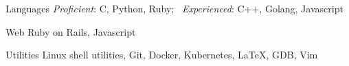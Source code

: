 


\begin{cvskills}


  \cvskill
  {Languages}
  {\textit{Proficient}: C, Python, Ruby; \
    \textit{Experienced}: C++, Golang, Javascript}


  \cvskill
  {Web}
  {Ruby on Rails, Javascript}


  \cvskill
  {Utilities}
  {Linux shell utilities, Git, Docker, Kubernetes, \LaTeX, GDB, Vim}




\end{cvskills}
